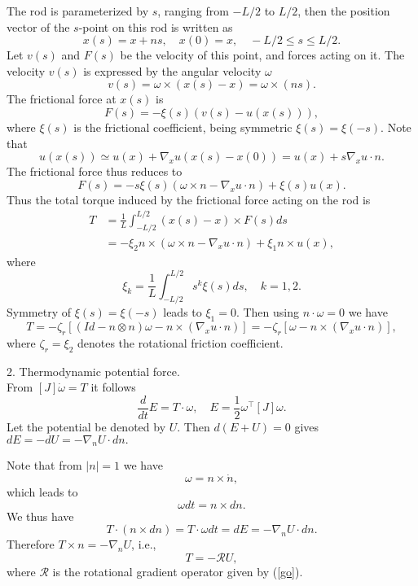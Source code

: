 \documentclass[reqno]{amsart}
\numberwithin{equation}{section}
\theoremstyle{definition}
\theoremstyle{remark}
\begin{document}
The rod is parameterized by $s$, ranging from
$-L/2$ to $L/2$, then the position vector of the $s$-point on this rod is written as
$$
x(s)=x+ ns, \quad x(0)=x, \quad -L/2\leq s\leq L/2.
$$
Let $v(s)$ and $F(s)$ be the velocity of this point, and forces acting on it. The velocity
$v(s)$ is expressed by the angular velocity $\omega$
$$
 v(s)=\omega \times (x(s)-x)=\omega \times (ns).
$$
The frictional force at $x(s)$ is
$$
F(s)=-\xi(s)(v(s)-u(x(s))),
$$
where $\xi(s)$ is the frictional coefficient, being symmetric $\xi(s)=\xi(-s)$.
Note that
$$
u(x(s))\simeq u(x)+\nabla_x u(x(s)-x(0))=u(x)+s \nabla_x u\cdot n.
$$
The frictional force thus reduces to
$$
F(s)=-s\xi(s)(\omega \times n -\nabla_x u \cdot n)+\xi(s)u(x).
$$
Thus the total torque induced by the frictional force acting on the rod  is
\begin{align*}
T& =\frac{1}{L}\int ^{L/2}_{-L/2}(x(s)-x)\times F(s)ds\\
 &=- \xi_2 n \times (\omega \times n -\nabla_x u \cdot
 n)+ \xi_1 n \times u(x),
\end{align*}
where
$$
\xi_k=\frac{1}{L}\int_{-L/2}^{L/2}s^k\xi(s) ds, \quad k=1, 2.
$$
Symmetry of $\xi(s)=\xi(-s)$ leads to $\xi_1=0$. Then using $n\cdot
\omega=0$ we have
$$
T=-\zeta_r\left[(Id-n\otimes n) \omega -n \times (\nabla_x u \cdot
n)\right]=-\zeta_r\left[\omega -n \times (\nabla_x u \cdot
n)\right],
$$
where $\zeta_r=\xi_2$ denotes the rotational friction coefficient.

2. Thermodynamic potential force. \\

From $[J]\dot \omega=T$ it follows
$$
\frac{d}{dt}E = T\cdot \omega, \quad E=\frac{1}{2} \omega^\top  [J]\omega.
$$
Let the potential be denoted by $U$. Then $d(E+U)=0$ gives
$dE=-dU=-\nabla_n U\cdot dn.$

Note that from $|n|=1$ we have
$$
\omega =n \times \dot n,
$$
which leads to
$$
\omega dt=n\times dn.
$$
We thus have
$$
T\cdot(n\times dn)=T\cdot \omega dt=dE=-\nabla_n U \cdot dn.
$$
Therefore $T\times n=-\nabla_n U$, i.e.,
\begin{equation}\label{ru}
    T=-\mathcal{R}U,
\end{equation}
where $ \mathcal{R}$ is the rotational gradient operator given by
(\ref{go}).
\end{document}
